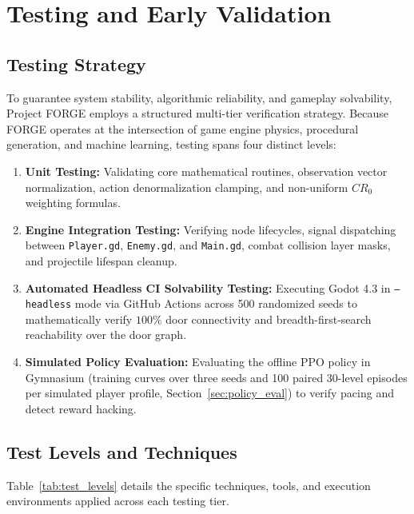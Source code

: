 \chapter{Testing and Early Validation}
\label{chap:testing}

\section{Testing Strategy}
To guarantee system stability, algorithmic reliability, and gameplay solvability, Project FORGE employs a structured multi-tier verification strategy. Because FORGE operates at the intersection of game engine physics, procedural generation, and machine learning, testing spans four distinct levels:
\begin{enumerate}
    \item \textbf{Unit Testing:} Validating core mathematical routines, observation vector normalization, action denormalization clamping, and non-uniform $CR_0$ weighting formulas.
    \item \textbf{Engine Integration Testing:} Verifying node lifecycles, signal dispatching between \texttt{Player.gd}, \texttt{Enemy.gd}, and \texttt{Main.gd}, combat collision layer masks, and projectile lifespan cleanup.
    \item \textbf{Automated Headless CI Solvability Testing:} Executing Godot 4.3 in \texttt{--headless} mode via GitHub Actions across 500 randomized seeds to mathematically verify $100\%$ door connectivity and breadth-first-search reachability over the door graph.
    \item \textbf{Simulated Policy Evaluation:} Evaluating the offline PPO policy in Gymnasium (training curves over three seeds and 100 paired 30-level episodes per simulated player profile, Section~\ref{sec:policy_eval}) to verify pacing and detect reward hacking.
\end{enumerate}

\section{Test Levels and Techniques}
Table~\ref{tab:test_levels} details the specific techniques, tools, and execution environments applied across each testing tier.

